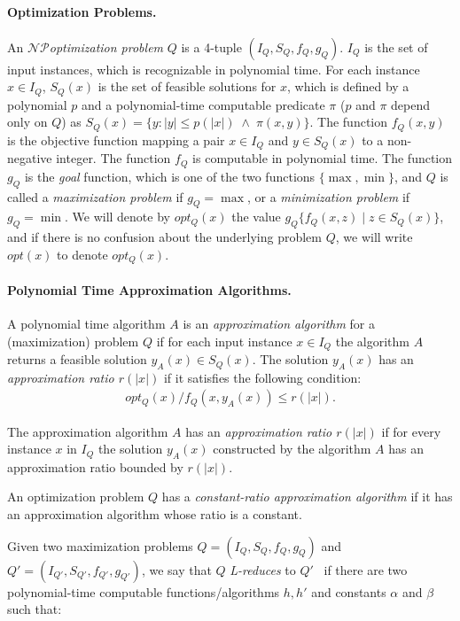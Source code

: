 \documentclass[11pt]{article}
\newcommand{\NP}{\mbox{$\mathcal{NP}$}}
\begin{document}
\paragraph{Optimization Problems.} An {\it \NP optimization problem} $Q$ is a 4-tuple $(I_Q, S_Q, f_Q, g_Q)$. $I_Q$ is the set of input instances, which is recognizable in polynomial time. For each instance $x \in I_Q$, $S_Q(x)$ is the set of feasible solutions for $x$, which is defined by a polynomial $p$ and a polynomial-time computable predicate $\pi$ ($p$ and $\pi$ depend only on $Q$) as $S_Q(x) = \{ y : |y| \leq p(|x|) \;\wedge\; \pi(x, y)\}$. The function $f_Q(x, y)$ is the objective function mapping a pair $x \in I_Q$ and $y \in S_Q(x)$ to a non-negative integer.  The function $f_Q$ is computable in polynomial time. The function $g_Q$ is the {\em goal} function, which is one of the two functions $\{\max, \min\}$, and $Q$ is called a {\it maximization problem} if $g_Q = \max$, or a {\it minimization problem} if $g_Q = \min$. We will denote by $opt_Q(x)$ the value $g_Q\{f_Q(x, z) \mid z \in S_Q(x) \}$, and if there is no confusion about the underlying problem $Q$, we will write $opt(x)$ to denote $opt_Q(x)$.

\paragraph{Polynomial Time Approximation Algorithms.} A polynomial time algorithm $A$ is an {\it approximation algorithm} for a (maximization)
problem $Q$ if for each input instance $x \in I_Q$ the algorithm $A$
returns a feasible solution $y_A(x) \in S_Q(x)$.  The solution $y_A(x)$
has an {\it approximation ratio $r(|x|)$} if it satisfies the following
condition:
\begin{eqnarray*}
opt_Q(x)/f_Q(x, y_A(x)) \leq r(|x|).
\end{eqnarray*}

The approximation algorithm $A$ has an {\it approximation ratio $r(|x|)$} if
for every instance $x$ in $I_Q$ the solution $y_A(x)$ constructed by the
algorithm $A$ has an approximation ratio bounded by $r(|x|)$.

An optimization problem $Q$ has a {\em constant-ratio approximation algorithm} if it has an approximation algorithm whose ratio is a constant.

Given two maximization problems $Q = (I_Q, S_Q, f_Q, g_Q)$ and $Q' = (I_{Q'}, S_{Q'}, f_{Q'}, g_{Q'})$, we say that $Q$ {\em L-reduces} to $Q'$~\cite{py91} if there are two polynomial-time computable functions/algorithms $h, h'$ and constants $\alpha$ and $\beta$ such that:
\end{document}
